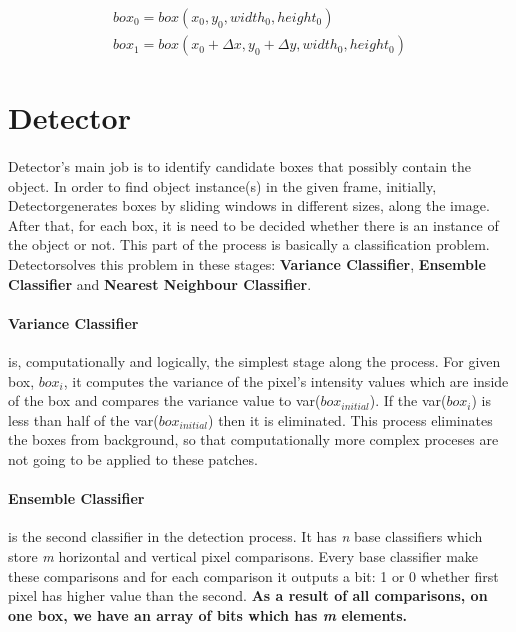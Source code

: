 \documentclass{report}
\newcommand{\Detector}{Detector}
\newcommand{\initialbox}{$ box_{initial} $}
\begin{document}
            \begin{gather}
                box_{0} = box(x_{0}, y_{0}, width_{0}, height_{0}) \\
                box_{1} = box(x_{0} + \Delta x, y_{0} + \Delta y, width_{0}, height_{0})
            \end{gather}
    \section{Detector}
        \paragraph{}
            \Detector's main job is to identify candidate boxes that possibly contain the object. In order to find
            object instance(s) in the given frame, initially, \Detector generates boxes by sliding windows in different sizes,
            along the image. After that, for each box, it is need to be decided whether there is an instance of the object or not.
            This part of the process is basically a classification problem. \Detector solves this problem in these stages:
            \textbf{Variance Classifier}, \textbf{Ensemble Classifier} and \textbf{Nearest Neighbour Classifier}.

        \paragraph{Variance Classifier}
            is, computationally and logically, the simplest stage along the process.
            For given box, $box_{i}$, it computes the variance of the pixel's intensity values which are inside of the box and
            compares the variance value to var(\initialbox). If the var($box_{i}$) is less than half of the
            var(\initialbox) then it is eliminated. This process eliminates the boxes from background, so that
            computationally more complex proceses are not going to be applied to these patches.

        \paragraph{Ensemble Classifier} is the second classifier in the detection process. It has
            \emph{n} base classifiers which store \emph{m} horizontal and vertical pixel comparisons.
            Every base classifier make these comparisons and for each comparison it outputs a bit: 1 or 0
            whether first pixel has higher value than the second.
            \textbf{As a result of all comparisons, on one box, we have an array of bits which has \emph{m} elements.}
\end{document}
